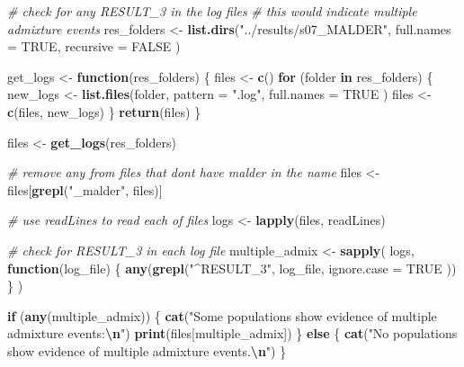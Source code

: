 \documentclass[
]{article}
\newenvironment{Shaded}{\begin{snugshade}}{\end{snugshade}}
\newcommand{\AttributeTok}[1]{\textcolor[rgb]{0.13,0.29,0.53}{#1}}
\newcommand{\CommentTok}[1]{\textcolor[rgb]{0.56,0.35,0.01}{\textit{#1}}}
\newcommand{\ConstantTok}[1]{\textcolor[rgb]{0.56,0.35,0.01}{#1}}
\newcommand{\ControlFlowTok}[1]{\textcolor[rgb]{0.13,0.29,0.53}{\textbf{#1}}}
\newcommand{\FunctionTok}[1]{\textcolor[rgb]{0.13,0.29,0.53}{\textbf{#1}}}
\newcommand{\NormalTok}[1]{#1}
\newcommand{\OtherTok}[1]{\textcolor[rgb]{0.56,0.35,0.01}{#1}}
\newcommand{\SpecialCharTok}[1]{\textcolor[rgb]{0.81,0.36,0.00}{\textbf{#1}}}
\newcommand{\StringTok}[1]{\textcolor[rgb]{0.31,0.60,0.02}{#1}}
\begin{document}
\begin{Shaded}
\begin{Highlighting}[]
\CommentTok{\# check for any \textquotesingle{}RESULT\_3\textquotesingle{} in the log files}
\CommentTok{\# this would indicate multiple admixture events}
\NormalTok{res\_folders }\OtherTok{\textless{}{-}} \FunctionTok{list.dirs}\NormalTok{(}\StringTok{"../results/s07\_MALDER"}\NormalTok{,}
  \AttributeTok{full.names =} \ConstantTok{TRUE}\NormalTok{,}
  \AttributeTok{recursive =} \ConstantTok{FALSE}
\NormalTok{)}

\NormalTok{get\_logs }\OtherTok{\textless{}{-}} \ControlFlowTok{function}\NormalTok{(res\_folders) \{}
\NormalTok{  files }\OtherTok{\textless{}{-}} \FunctionTok{c}\NormalTok{()}
  \ControlFlowTok{for}\NormalTok{ (folder }\ControlFlowTok{in}\NormalTok{ res\_folders) \{}
\NormalTok{    new\_logs }\OtherTok{\textless{}{-}} \FunctionTok{list.files}\NormalTok{(folder,}
      \AttributeTok{pattern =} \StringTok{".log"}\NormalTok{,}
      \AttributeTok{full.names =} \ConstantTok{TRUE}
\NormalTok{    )}
\NormalTok{    files }\OtherTok{\textless{}{-}} \FunctionTok{c}\NormalTok{(files, new\_logs)}
\NormalTok{  \}}
  \FunctionTok{return}\NormalTok{(files)}
\NormalTok{\}}

\NormalTok{files }\OtherTok{\textless{}{-}} \FunctionTok{get\_logs}\NormalTok{(res\_folders)}



\CommentTok{\# remove any from files that don\textquotesingle{}t have \textquotesingle{}malder\textquotesingle{} in  the name}
\NormalTok{files }\OtherTok{\textless{}{-}}\NormalTok{ files[}\FunctionTok{grepl}\NormalTok{(}\StringTok{"\_malder"}\NormalTok{, files)]}

\CommentTok{\# use readLines to read each of files}
\NormalTok{logs }\OtherTok{\textless{}{-}} \FunctionTok{lapply}\NormalTok{(files, readLines)}

\CommentTok{\# check for \textquotesingle{}RESULT\_3\textquotesingle{} in each log file}
\NormalTok{multiple\_admix }\OtherTok{\textless{}{-}} \FunctionTok{sapply}\NormalTok{(}
\NormalTok{  logs,}
  \ControlFlowTok{function}\NormalTok{(log\_file) \{}
    \FunctionTok{any}\NormalTok{(}\FunctionTok{grepl}\NormalTok{(}\StringTok{"\^{}RESULT\_3"}\NormalTok{,}
\NormalTok{      log\_file,}
      \AttributeTok{ignore.case =} \ConstantTok{TRUE}
\NormalTok{    ))}
\NormalTok{  \}}
\NormalTok{)}

\ControlFlowTok{if}\NormalTok{ (}\FunctionTok{any}\NormalTok{(multiple\_admix)) \{}
  \FunctionTok{cat}\NormalTok{(}\StringTok{"Some populations show evidence of multiple admixture events:}\SpecialCharTok{\textbackslash{}n}\StringTok{"}\NormalTok{)}
  \FunctionTok{print}\NormalTok{(files[multiple\_admix])}
\NormalTok{\} }\ControlFlowTok{else}\NormalTok{ \{}
  \FunctionTok{cat}\NormalTok{(}\StringTok{"No populations show evidence of multiple admixture events.}\SpecialCharTok{\textbackslash{}n}\StringTok{"}\NormalTok{)}
\NormalTok{\}}
\end{Highlighting}
\end{Shaded}
\end{document}
